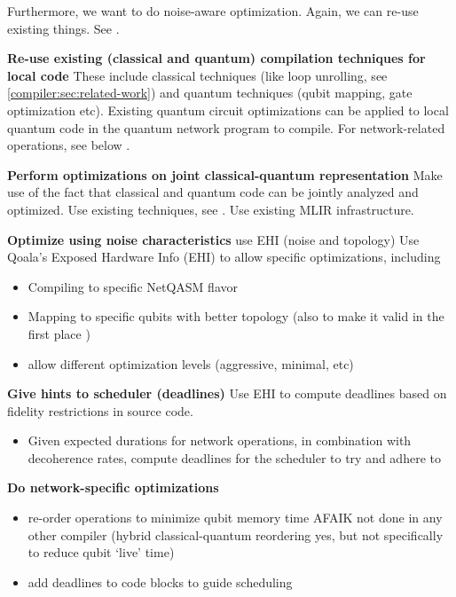 Furthermore, we want to do noise-aware optimization.
Again, we can re-use existing things. See \cite{smith_error_2021, murali_noise-adaptive_2019}.




\textbf{Re-use existing (classical and quantum) compilation techniques for local code}
These include classical techniques (like loop unrolling, see \cref{compiler:sec:related-work}) and quantum techniques (qubit mapping, gate optimization etc).
Existing quantum circuit optimizations can be applied to local quantum code in the quantum network program to compile.
For network-related operations, see below .

\textbf{Perform optimizations on joint classical-quantum representation}
Make use of the fact that classical and quantum code can be jointly analyzed and optimized.
Use existing techniques, see \cite{mccaskey_mlir_2021, ittah_enabling_2022, nguyen_retargetable_2022, peduri_qssa_2022}.
Use existing \ac{MLIR} infrastructure.

\textbf{Optimize using noise characteristics} use EHI (noise and topology)
Use Qoala's Exposed Hardware Info (EHI) to allow specific optimizations, including
\begin{itemize}
  \item Compiling to specific NetQASM flavor
  \item Mapping to specific qubits with better topology (also to make it valid in the first place )
  \item allow different optimization levels (aggressive, minimal, etc)
\end{itemize}


\textbf{Give hints to scheduler (deadlines)}
Use EHI to compute deadlines based on fidelity restrictions in source code.
\begin{itemize}
  \item Given expected durations for network operations, in combination with decoherence rates, compute deadlines for the scheduler to try and adhere to
\end{itemize}

\textbf{Do network-specific optimizations}
\begin{itemize}
  \item re-order operations to minimize qubit memory time
    AFAIK not done in any other compiler (hybrid classical-quantum reordering yes, but not specifically to reduce qubit `live' time)
  \item add deadlines to code blocks to guide scheduling
\end{itemize}

